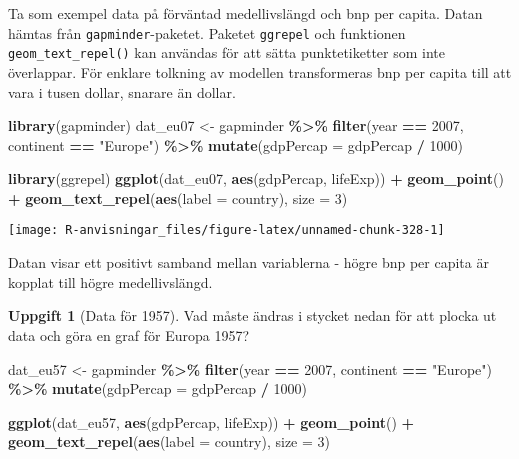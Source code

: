 \documentclass[
]{book}
\newenvironment{Shaded}{\begin{snugshade}}{\end{snugshade}}
\newcommand{\AttributeTok}[1]{\textcolor[rgb]{0.13,0.29,0.53}{#1}}
\newcommand{\DecValTok}[1]{\textcolor[rgb]{0.00,0.00,0.81}{#1}}
\newcommand{\FunctionTok}[1]{\textcolor[rgb]{0.13,0.29,0.53}{\textbf{#1}}}
\newcommand{\NormalTok}[1]{#1}
\newcommand{\OtherTok}[1]{\textcolor[rgb]{0.56,0.35,0.01}{#1}}
\newcommand{\SpecialCharTok}[1]{\textcolor[rgb]{0.81,0.36,0.00}{\textbf{#1}}}
\newcommand{\StringTok}[1]{\textcolor[rgb]{0.31,0.60,0.02}{#1}}
\theoremstyle{definition}
\theoremstyle{definition}
\theoremstyle{definition}
\newtheorem{exercise}{Uppgift}[chapter]
\theoremstyle{definition}
\theoremstyle{remark}
\begin{document}
Ta som exempel data på förväntad medellivslängd och bnp per capita. Datan hämtas från \texttt{gapminder}-paketet. Paketet \texttt{ggrepel} och funktionen \texttt{geom\_text\_repel()} kan användas för att sätta punktetiketter som inte överlappar. För enklare tolkning av modellen transformeras bnp per capita till att vara i tusen dollar, snarare än dollar.

\begin{Shaded}
\begin{Highlighting}[]
\FunctionTok{library}\NormalTok{(gapminder)}
\NormalTok{dat\_eu07 }\OtherTok{\textless{}{-}}\NormalTok{ gapminder }\SpecialCharTok{\%\textgreater{}\%} 
  \FunctionTok{filter}\NormalTok{(year }\SpecialCharTok{==} \DecValTok{2007}\NormalTok{, continent }\SpecialCharTok{==} \StringTok{"Europe"}\NormalTok{) }\SpecialCharTok{\%\textgreater{}\%} 
  \FunctionTok{mutate}\NormalTok{(}\AttributeTok{gdpPercap =}\NormalTok{ gdpPercap }\SpecialCharTok{/} \DecValTok{1000}\NormalTok{)}

\FunctionTok{library}\NormalTok{(ggrepel)}
\FunctionTok{ggplot}\NormalTok{(dat\_eu07, }\FunctionTok{aes}\NormalTok{(gdpPercap, lifeExp)) }\SpecialCharTok{+}
  \FunctionTok{geom\_point}\NormalTok{() }\SpecialCharTok{+}
  \FunctionTok{geom\_text\_repel}\NormalTok{(}\FunctionTok{aes}\NormalTok{(}\AttributeTok{label =}\NormalTok{ country), }\AttributeTok{size =} \DecValTok{3}\NormalTok{)}
\end{Highlighting}
\end{Shaded}

\begin{center}\texttt{[image: R-anvisningar\_files/figure-latex/unnamed-chunk-328-1]} \end{center}

Datan visar ett positivt samband mellan variablerna - högre bnp per capita är kopplat till högre medellivslängd.

\begin{exercise}[Data för 1957]

Vad måste ändras i stycket nedan för att plocka ut data och göra en graf för Europa 1957?

\begin{Shaded}
\begin{Highlighting}[]
\NormalTok{dat\_eu57 }\OtherTok{\textless{}{-}}\NormalTok{ gapminder }\SpecialCharTok{\%\textgreater{}\%} 
  \FunctionTok{filter}\NormalTok{(year }\SpecialCharTok{==} \DecValTok{2007}\NormalTok{, continent }\SpecialCharTok{==} \StringTok{"Europe"}\NormalTok{) }\SpecialCharTok{\%\textgreater{}\%} 
  \FunctionTok{mutate}\NormalTok{(}\AttributeTok{gdpPercap =}\NormalTok{ gdpPercap }\SpecialCharTok{/} \DecValTok{1000}\NormalTok{)}

\FunctionTok{ggplot}\NormalTok{(dat\_eu57, }\FunctionTok{aes}\NormalTok{(gdpPercap, lifeExp)) }\SpecialCharTok{+}
  \FunctionTok{geom\_point}\NormalTok{() }\SpecialCharTok{+}
  \FunctionTok{geom\_text\_repel}\NormalTok{(}\FunctionTok{aes}\NormalTok{(}\AttributeTok{label =}\NormalTok{ country), }\AttributeTok{size =} \DecValTok{3}\NormalTok{)}
\end{Highlighting}
\end{Shaded}

\end{exercise}
\end{document}
